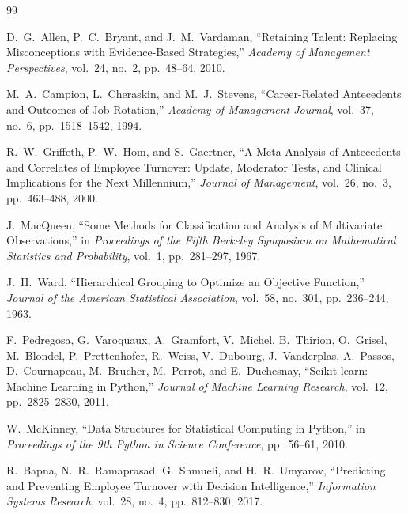 \documentclass[12pt,a4paper,oneside]{report}
\begin{document}
\clearpage
\begin{thebibliography}{99}

D.~G.~Allen, P.~C.~Bryant, and J.~M.~Vardaman, ``Retaining Talent: Replacing Misconceptions with Evidence-Based Strategies,'' \textit{Academy of Management Perspectives}, vol.~24, no.~2, pp.~48--64, 2010.

M.~A.~Campion, L.~Cheraskin, and M.~J.~Stevens, ``Career-Related Antecedents and Outcomes of Job Rotation,'' \textit{Academy of Management Journal}, vol.~37, no.~6, pp.~1518--1542, 1994.

R.~W.~Griffeth, P.~W.~Hom, and S.~Gaertner, ``A Meta-Analysis of Antecedents and Correlates of Employee Turnover: Update, Moderator Tests, and Clinical Implications for the Next Millennium,'' \textit{Journal of Management}, vol.~26, no.~3, pp.~463--488, 2000.

J.~MacQueen, ``Some Methods for Classification and Analysis of Multivariate Observations,'' in \textit{Proceedings of the Fifth Berkeley Symposium on Mathematical Statistics and Probability}, vol.~1, pp.~281--297, 1967.

J.~H.~Ward, ``Hierarchical Grouping to Optimize an Objective Function,'' \textit{Journal of the American Statistical Association}, vol.~58, no.~301, pp.~236--244, 1963.

F.~Pedregosa, G.~Varoquaux, A.~Gramfort, V.~Michel, B.~Thirion, O.~Grisel, M.~Blondel, P.~Prettenhofer, R.~Weiss, V.~Dubourg, J.~Vanderplas, A.~Passos, D.~Cournapeau, M.~Brucher, M.~Perrot, and E.~Duchesnay, ``Scikit-learn: Machine Learning in Python,'' \textit{Journal of Machine Learning Research}, vol.~12, pp.~2825--2830, 2011.

W.~McKinney, ``Data Structures for Statistical Computing in Python,'' in \textit{Proceedings of the 9th Python in Science Conference}, pp.~56--61, 2010.

R.~Bapna, N.~R.~Ramaprasad, G.~Shmueli, and H.~R.~Umyarov, ``Predicting and Preventing Employee Turnover with Decision Intelligence,'' \textit{Information Systems Research}, vol.~28, no.~4, pp.~812--830, 2017.


\end{thebibliography}
\end{document}
